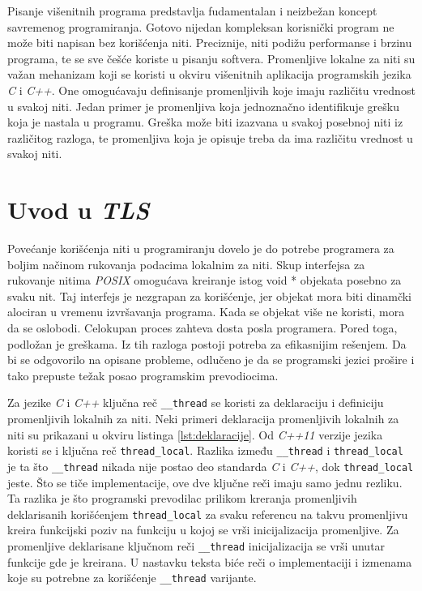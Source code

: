 \documentclass[12pt,oneside]{memoir}
\begin{document}
Pisanje višenitnih programa predstavlja fudamentalan i neizbežan koncept savremenog programiranja. Gotovo nijedan kompleksan korisnički program ne može biti napisan bez korišćenja niti. Preciznije, niti podižu performanse i brzinu programa, te se sve češće koriste u pisanju softvera. Promenljive lokalne za niti su važan mehanizam koji se koristi u okviru višenitnih aplikacija programskih jezika \emph{C} i \emph{C++}. One omogućavaju definisanje promenljivih koje imaju različitu vrednost u svakoj niti. Jedan primer je promenljiva koja jednoznačno identifikuje grešku koja je nastala u programu. Greška može biti izazvana u svakoj posebnoj niti iz različitog razloga, te promenljiva koja je opisuje treba da ima različitu vrednost u svakoj niti.

\section{Uvod u \emph{TLS}}

Povećanje korišćenja niti u programiranju dovelo je do potrebe programera za boljim načinom rukovanja podacima lokalnim za niti. Skup interfejsa za rukovanje nitima \emph{POSIX} \cite{POSIX} omogućava kreiranje istog void * objekata posebno za svaku nit. Taj interfejs je nezgrapan za korišćenje, jer objekat mora biti dinamčki alociran u vremenu izvršavanja programa. Kada se objekat više ne koristi, mora da se oslobodi. Celokupan proces zahteva dosta posla programera. Pored toga, podložan je greškama. Iz tih razloga postoji potreba za efikasnijim rešenjem. Da bi se odgovorilo na opisane probleme, odlučeno je da se programski jezici prošire i tako prepuste težak posao programskim prevodiocima.

Za jezike \emph{C} i \emph{C++} ključna reč \texttt{\_\_thread} se koristi za deklaraciju i definiciju promenljivih lokalnih za niti. Neki primeri deklaracija promenljivih lokalnih za niti su prikazani u okviru listinga \ref{lst:deklaracije}. Od \emph{C++11} verzije jezika koristi se i ključna reč \texttt{thread\_local}. Razlika između \texttt{\_\_thread} i \texttt{thread\_local} je ta što \texttt{\_\_thread} nikada nije postao deo standarda \emph{C} i \emph{C++}, dok \texttt{thread\_local} jeste. Što se tiče implementacije, ove dve ključne reči imaju samo jednu rezliku. Ta razlika je što programski prevodilac prilikom kreranja promenljivih deklarisanih korišćenjem \texttt{thread\_local} za svaku referencu na takvu promenljivu kreira funkcijski poziv na funkciju u kojoj se vrši inicijalizacija promenljive. Za promenljive deklarisane ključnom reči \texttt{\_\_thread} inicijalizacija se vrši unutar funkcije gde je kreirana. U nastavku teksta biće reči o implementaciji i izmenama koje su potrebne za korišćenje \texttt{\_\_thread} varijante.
\end{document}

